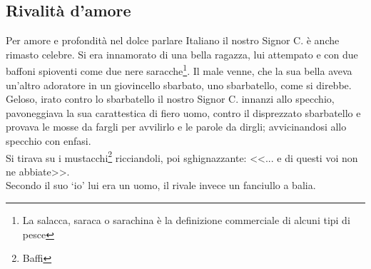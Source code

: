 \subsection{Rivalità d'amore}
Per amore e profondità nel dolce parlare Italiano il nostro Signor C. è anche rimasto celebre. Si era innamorato di una bella ragazza, lui attempato e con due baffoni spioventi come due nere saracche\footnote{La salacca, saraca o sarachina è la definizione commerciale di alcuni tipi di pesce}. Il male venne, che la sua bella aveva un'altro adoratore in un giovincello sbarbato, uno sbarbatello, come si direbbe. Geloso, irato contro lo sbarbatello il nostro Signor C. innanzi allo specchio, pavoneggiava la sua carattestica di fiero uomo, contro il disprezzato sbarbatello e provava le mosse da fargli per avvilirlo e le parole da dirgli; avvicinandosi allo specchio con enfasi. \\
\indent Si tirava su i mustacchi\footnote{Baffi} ricciandoli, poi sghignazzante: <<... e di questi voi non ne abbiate>>.\\
\indent Secondo il suo `io' lui era un uomo, il rivale invece un fanciullo a balia.








































%
